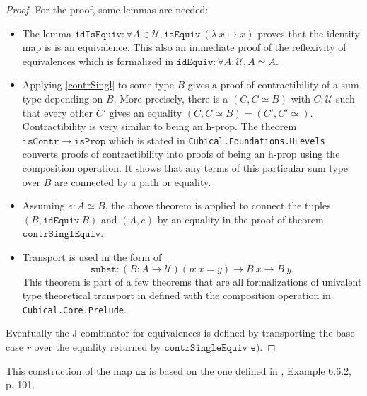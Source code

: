\documentclass[12pt,a4paper,twoside,xetex]{book} %
\newcommand{\op}[1]{\mathtt{#1}}
\newcommand{\type}{\mathcal{U}}
\begin{document}
\begin{proof}

For the proof, some lemmas are needed: 
\begin{itemize}

\item The lemma $\op{idIsEquiv}: \forall A \in \type , \op{isEquiv} \  
(\lambda \ x \mapsto x)$ proves that the identity map is is an equivalence. This also an immediate proof of the reflexivity of equivalences which is formalized in  $\op{idEquiv}: \forall A : \type, A 
\simeq A$.

\item Applying \cref{contrSingl} to some type $B$ gives a proof of 
contractibility of a sum type depending on $B$. More precisely, there is a $(C, 
C \simeq B)$ with $C:\mathcal{U}$ such that every other $C'$ gives an equality 
$(C,C \simeq B) = (C',C'\simeq)$. Contractibility is very similar to being an 
h-prop. The theorem $\op{isContr} \rightarrow \op{isProp}$ which is stated in 
\texttt{Cubical.Foundations.HLevels} converts proofs of contractibility into 
proofs of being an h-prop using the composition operation. It shows that any 
terms of this particular sum type over $B$ are connected by a path or equality.


\item   Assuming $e : A \simeq B$, the above theorem is applied to connect the 
tuples $(B, \op{idEquiv} \ B)$ and $(A, e)$ by an equality in the proof of 
theorem $\op{contrSinglEquiv}$.

\item Transport is used in the form of $$\op{subst} : \left(B : A \rightarrow \type 
\right) (p : x = y) \rightarrow B \ x \rightarrow B \ y.$$ This theorem is part 
of a few theorems that are all formalizations of univalent type theoretical 
transport in defined with the composition operation in 
\texttt{Cubical.Core.Prelude}.

\end{itemize}

Eventually the J-combinator for equivalences is defined by transporting the 
base case $r$ over the equality returned by $\texttt{contrSingleEquiv e)}$.

\end{proof}

This construction of the map $\op{ua}$ is based on the one defined in 
\cite{Huber2016}, Example 6.6.2, p. 101.
\end{document}
